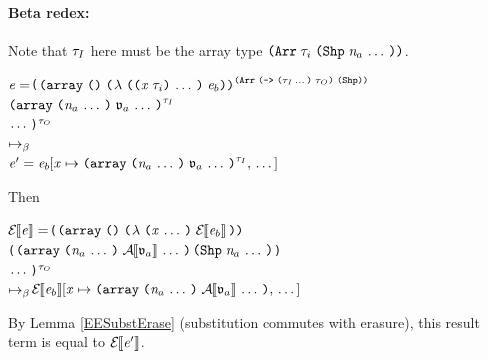 \begin{sproof}
  \paragraph{Beta redex:}
  Note that $\mathit{\tau}_I$ here must be the array type
  $\typearray{\type_i}{\idxshape{\sequence{\nat_a}}}$.
  \newcommand{\betafnannot}
  {\typearray
    {\typefun
      {\sequence{\type_I}}
      {\type_O}}
    {\idxshape{}}}
  \newcommand{\betafn}
  {\notedarrlit[\betafnannot]
    {\lam{\sequence{\notevar{\var}{\type_i}}}{\expr_b}}
    {}}
  \newcommand{\erasedbetafn}
  {\arrlit
    {\lam{\sequence{\var}}{\EraseE{\expr_b}}}
    {}}
  \newcommand{\betaarg}{\notedarrlit[\type_I]{\sequence{\atval_a}}{\sequence{\nat_a}}}
  \newcommand{\erasedbetaarg}{\arrlit{\sequence{\EraseA{\atval_a}}}{\sequence{\nat_a}}}
  \newcommand{\erasedbetacell}{\idxshape{\sequence{\nat_a}}}
\begin{alltt}
\(\expr = \)(\(\betafn\)\\
\phantom{\(\expr = \) }\(\betaarg\)\\
\phantom{\(\expr = \) }\(\sequence{}\))\(\sp{\type\sb{O}}\)\\
\(\mapsto\sb{\beta}\)\\
\(\expr' = \seqsubst{\expr\sb{b}}{\var}{\betaarg}\)
\end{alltt}
Then
\begin{alltt}
\(\EraseE{\expr} = \)(\(\erasedbetafn\)\\
\phantom{\(\EraseE{\expr} = \) }(\(\erasedbetaarg\) \(\erasedbetacell\))\\
\phantom{\(\EraseE{\expr} = \) }\(\sequence{}\))\(\sp{\type\sb{O}}\)\\
\(\mapsto\sb{\beta}\) \(\seqsubst{\EraseE{\expr\sb{b}}}{\var}{\erasedbetaarg}\)
\end{alltt}
By Lemma \ref{EESubstErase} (substitution commutes with erasure),
this result term is equal to $\mathcal{E}{\hskip-.25em}\left\llbracket \mathit{e}' \right\rrbracket$.



\end{sproof}
